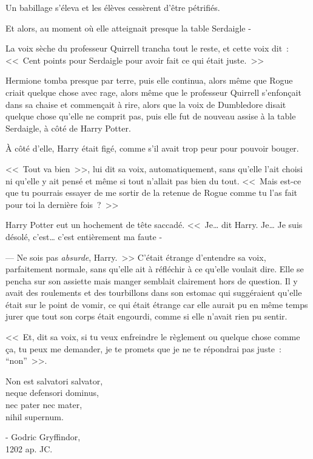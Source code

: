 Un babillage s'éleva et les élèves cessèrent d'être pétrifiés.

Et alors, au moment où elle atteignait presque la table Serdaigle -

La voix sèche du professeur Quirrell trancha tout le reste, et cette voix dit~: <<~Cent points pour Serdaigle pour avoir fait ce qui était juste.~>>

Hermione tomba presque par terre, puis elle continua, alors même que Rogue criait quelque chose avec rage, alors même que le professeur Quirrell s'enfonçait dans sa chaise et commençait à rire, alors que la voix de Dumbledore disait quelque chose qu'elle ne comprit pas, puis elle fut de nouveau assise à la table Serdaigle, à côté de Harry Potter.

À côté d'elle, Harry était figé, comme s'il avait trop peur pour pouvoir bouger.

<<~Tout va bien~>>, lui dit sa voix, automatiquement, sans qu'elle l'ait choisi ni qu'elle y ait pensé et même si tout n'allait pas bien du tout. <<~Mais est-ce que tu pourrais essayer de me sortir de la retenue de Rogue comme tu l'as fait pour toi la dernière fois~?~>>

Harry Potter eut un hochement de tête saccadé. <<~Je… dit Harry. Je… Je suis désolé, c'est… c'est entièrement ma faute -

--- Ne sois pas \emph{absurde}, Harry.~>> C'était étrange d'entendre sa voix, parfaitement normale, sans qu'elle ait à réfléchir à ce qu'elle voulait dire. Elle se pencha sur son assiette mais manger semblait clairement hors de question. Il y avait des roulements et des tourbillons dans son estomac qui suggéraient qu'elle était sur le point de vomir, ce qui était étrange car elle aurait pu en même temps jurer que tout son corps était engourdi, comme si elle n'avait rien pu sentir.

<<~Et, dit sa voix, si tu veux enfreindre le règlement ou quelque chose comme ça, tu peux me demander, je te promets que je ne te répondrai pas juste~: “non”~>>.
\later

\begin{center}
Non est salvatori salvator,\\
neque defensori dominus,\\
nec pater nec mater,\\
nihil supernum.

- Godric Gryffindor,\\
1202 ap. JC.
\end{center}

